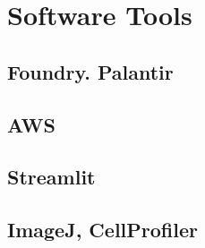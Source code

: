 \section{Software Tools}
    \subsection{Foundry. Palantir}
    \subsection{AWS}
    \subsection{Streamlit}
    \subsection{ImageJ, CellProfiler}